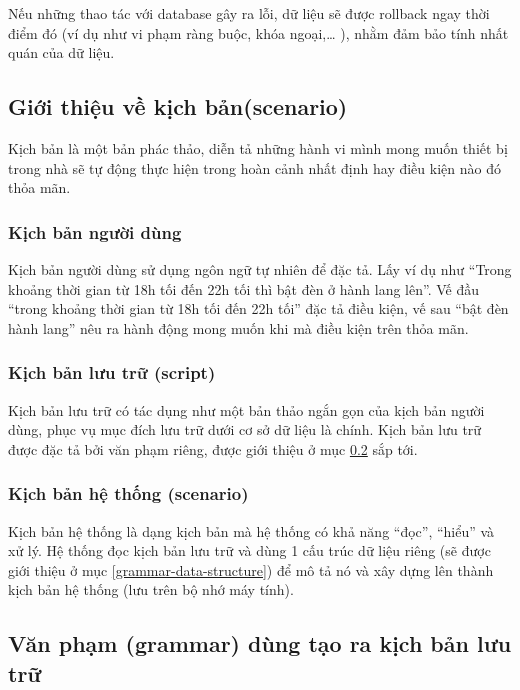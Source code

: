 \documentclass[12pt,a4paper,oneside]{extbook}
\begin{document}
Nếu những thao tác với database gây ra lỗi, dữ liệu sẽ được rollback ngay thời điểm đó (ví dụ như vi phạm ràng buộc, khóa ngoại,\dots\hspace{0mm} ), nhằm đảm bảo tính nhất quán của dữ liệu.

\subsection{Giới thiệu về kịch bản(scenario)}

Kịch bản là một bản phác thảo, diễn tả những hành vi mình mong muốn thiết bị trong nhà sẽ tự động thực hiện trong hoàn cảnh nhất định hay điều kiện nào đó thỏa mãn. 

\subsubsection{Kịch bản người dùng}

Kịch bản người dùng sử dụng ngôn ngữ tự nhiên để đặc tả. Lấy ví dụ như “Trong khoảng thời gian từ 18h tối đến 22h tối thì bật đèn ở hành lang lên”. Vế đầu “trong khoảng thời gian từ 18h tối đến 22h tối” đặc tả điều kiện, vế sau “bật đèn hành lang” nêu ra hành động mong muốn khi mà điều kiện trên thỏa mãn.

\subsubsection{Kịch bản lưu trữ (script)}

Kịch bản lưu trữ có tác dụng như một bản thảo ngắn gọn của kịch bản người dùng, phục vụ mục đích lưu trữ dưới cơ sở dữ liệu là chính. Kịch bản lưu trữ được đặc tả bởi văn phạm riêng, được giới thiệu ở mục \ref{grammar} sắp tới.

\subsubsection{Kịch bản hệ thống (scenario)} 

Kịch bản hệ thống là dạng kịch bản mà hệ thống có khả năng “đọc”, “hiểu” và xử lý. Hệ thống đọc kịch bản lưu trữ và dùng 1 cấu trúc dữ liệu riêng (sẽ được giới thiệu ở mục \ref{grammar-data-structure}) để mô tả nó và xây dựng lên thành kịch bản hệ thống (lưu trên bộ nhớ máy tính).

\subsection{Văn phạm (grammar) dùng tạo ra kịch bản lưu trữ}\label{grammar}
\end{document}
